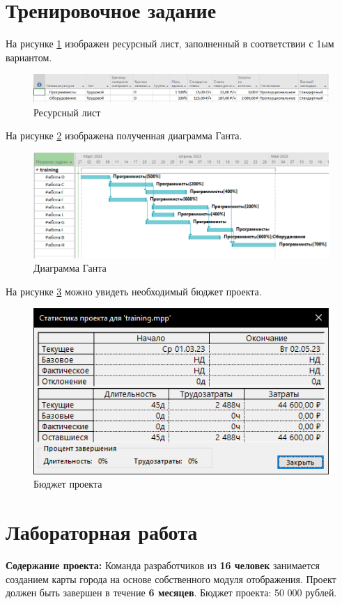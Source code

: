 \section*{Тренировочное задание}

На рисунке \ref{p1} изображен ресурсный лист, заполненный в соответствии с 1ым вариантом.
\begin{figure}[!h]
	\centering
	\includegraphics[width=1\linewidth]{inc/img/1.png}
	\caption{Ресурсный лист}
	\label{p1}
\end{figure}

На рисунке \ref{p2} изображена полученная диаграмма Ганта.
\begin{figure}[!h]
	\includegraphics[width=1\linewidth]{inc/img/2.png}
	\caption{Диаграмма Ганта}
	\label{p2}
\end{figure}

На рисунке \ref{p3} можно увидеть необходимый бюджет проекта.
\begin{figure}[!h]
	\centering
	\includegraphics[width=0.7\linewidth]{inc/img/3.png}
	\caption{Бюджет проекта}
	\label{p3}
\end{figure}

\section*{Лабораторная работа}
\textbf{Содержание проекта:} Команда разработчиков из \textbf{16 человек} занимается созданием карты города на основе собственного модуля отображения. Проект должен быть завершен в течение \textbf{6 месяцев}. Бюджет проекта: 50 000 рублей.

